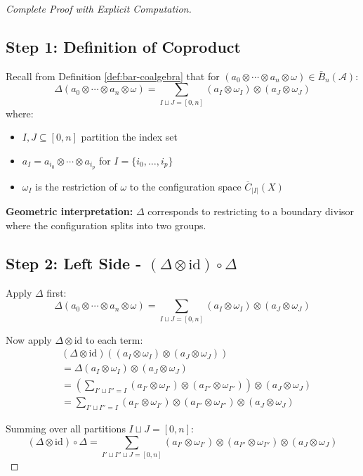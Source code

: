 \begin{proof}[Complete Proof with Explicit Computation]

\subsection*{Step 1: Definition of Coproduct}

Recall from Definition \ref{def:bar-coalgebra} that for $(a_0 \otimes \cdots \otimes a_n \otimes \omega) \in \bar{B}_n(\mathcal{A})$:
$$\Delta(a_0 \otimes \cdots \otimes a_n \otimes \omega) = \sum_{I \sqcup J = [0,n]} (a_I \otimes \omega_I) \otimes (a_J \otimes \omega_J)$$
where:
\begin{itemize}
\item $I, J \subseteq [0,n]$ partition the index set
\item $a_I = a_{i_0} \otimes \cdots \otimes a_{i_p}$ for $I = \{i_0, \ldots, i_p\}$
\item $\omega_I$ is the restriction of $\omega$ to the configuration space $\overline{C}_{|I|}(X)$
\end{itemize}

\textbf{Geometric interpretation:} $\Delta$ corresponds to restricting to a boundary divisor where the configuration splits into two groups.

\subsection*{Step 2: Left Side - $(\Delta \otimes \text{id}) \circ \Delta$}

Apply $\Delta$ first:
$$\Delta(a_0 \otimes \cdots \otimes a_n \otimes \omega) = \sum_{I \sqcup J = [0,n]} (a_I \otimes \omega_I) \otimes (a_J \otimes \omega_J)$$

Now apply $\Delta \otimes \text{id}$ to each term:
\begin{align*}
&(\Delta \otimes \text{id})\left((a_I \otimes \omega_I) \otimes (a_J \otimes \omega_J)\right) \\
&= \Delta(a_I \otimes \omega_I) \otimes (a_J \otimes \omega_J) \\
&= \left(\sum_{I' \sqcup I'' = I} (a_{I'} \otimes \omega_{I'}) \otimes (a_{I''} \otimes \omega_{I''})\right) \otimes (a_J \otimes \omega_J) \\
&= \sum_{I' \sqcup I'' = I} (a_{I'} \otimes \omega_{I'}) \otimes (a_{I''} \otimes \omega_{I''}) \otimes (a_J \otimes \omega_J)
\end{align*}

Summing over all partitions $I \sqcup J = [0,n]$:
$$(\Delta \otimes \text{id}) \circ \Delta = \sum_{I' \sqcup I'' \sqcup J = [0,n]} (a_{I'} \otimes \omega_{I'}) \otimes (a_{I''} \otimes \omega_{I''}) \otimes (a_J \otimes \omega_J)$$


\end{proof}
